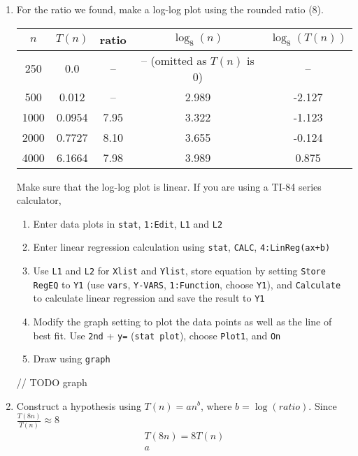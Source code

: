 \begin{enumerate}
  \item For the ratio we found, make a log-log plot using the rounded ratio (8).
    \begin{center}
      \begin{tabular}{ | c | c | c | c | c |}
        \hline
        $n$ & $T(n)$ & ratio & $\log_{8} (n)$ & $\log_{8} (T(n))$ \\
        \hline
        250 & 0.0 & -- & -- (omitted as $T(n)$ is 0) & -- \\
        500 & 0.012 & -- & 2.989 & -2.127 \\
        1000 & 0.0954 & 7.95 & 3.322 & -1.123 \\
        2000 & 0.7727 & 8.10 & 3.655 & -0.124 \\
        4000 & 6.1664 & 7.98 & 3.989 & 0.875 \\
        \hline
      \end{tabular}
    \end{center}
    Make sure that the log-log plot is linear.
    If you are using a TI-84 series calculator,
    \begin{enumerate}
      \item Enter data plots in \texttt{stat}, \texttt{1:Edit}, \texttt{L1} and \texttt{L2}
      \item Enter linear regression calculation using \texttt{stat}, \texttt{CALC}, \texttt{4:LinReg(ax+b)}
      \item Use \texttt{L1} and \texttt{L2} for \texttt{Xlist} and \texttt{Ylist}, store equation by setting \texttt{Store RegEQ} to \texttt{Y1}
        (use \texttt{vars}, \texttt{Y-VARS}, \texttt{1:Function}, choose \texttt{Y1}),
        and \texttt{Calculate} to calculate linear regression and save the result to \texttt{Y1}
      \item Modify the graph setting to plot the data points as well as the line of best fit.
        Use \texttt{2nd} + \texttt{y=} (\texttt{stat plot}), choose \texttt{Plot1}, and \texttt{On}
      \item Draw using \texttt{graph}
    \end{enumerate}

    // TODO graph

  \item Construct a hypothesis using $T(n) = an^{b}$, where $b = \log (ratio)$.
    Since $\frac{T(8n)}{T(n)} \approx 8$
    \begin{align*}
      T(8n) = 8T(n) \\
      a 
    \end{align*}
\end{enumerate}

